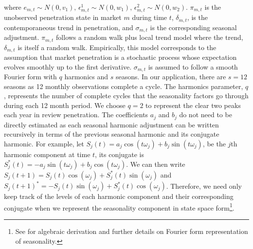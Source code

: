 \documentclass[mksc,blindrev]{informs3} %
\begin{document}
where $e_{m,t}\sim N(0,v_1)\text{, }\epsilon_{m,t}^{1}\sim N(0,w_1)\text{, }\epsilon_{m,t}^{2}\sim N(0,w_2)$. $\pi_{m,t}$ is the unobserved penetration state in market $m$ during time $t$, $\delta_{m,t}$, is the contemporaneous trend in penetration, and $\sigma_{m,t}$ is the corresponding seasonal adjustment. $\pi_{m,t}$ follows a random walk plus local trend model where the trend, $\delta_{m,t}$ is itself a random walk. Empirically, this model corresponds to the assumption that market penetration is a stochastic process whose expectation evolves smoothly up to the first derivative. $\sigma_{m,t}$ is assumed to follow a smooth Fourier form with $q$ harmonics and $s$ seasons. In our application, there are $s=12$ seasons as 12 monthly observations complete a cycle. The harmonics parameter, $q$, represents the number of complete cycles that the seasonality factors go through during each 12 month period. We choose $q=2$ to represent the clear two peaks each year in review penetration. The coefficients $a_j$ and $b_j$ do not need to be directly estimated as each seasonal harmonic adjustment can be written recursively in terms of the previous seasonal harmonic and its conjugate harmonic. For example, let $S_j(t)=a_j\cos(t\omega_j)+b_j\sin(t\omega_j)$, be the $j$th harmonic component at time $t$, its conjugate is $S_j^{*}(t)=-a_j\sin(t\omega_j)+b_j\cos(t\omega_j)$. We can then write $S_j(t+1)=S_j(t)\cos(\omega_j)+S_j^{*}(t)\sin(\omega_j)$ and $S_j(t+1)^{*}=-S_j(t)\sin(\omega_j)+S_j^{*}(t)\cos(\omega_j)$. Therefore, we need only keep track of the levels of each harmonic component and their corresponding conjugate when we represent the seasonality component in state space form\footnote{See \citet{petrisDLM} for algebraic derivation and further details on Fourier form representation of seasonality.}.
\end{document}

